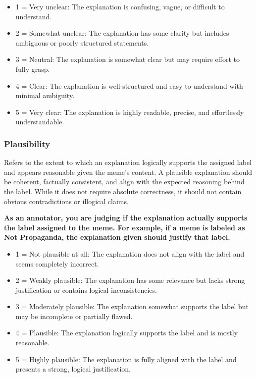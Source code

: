 \begin{itemize}[noitemsep,topsep=0pt,labelsep=.5em] %
    \item 1 = Very unclear: The explanation is confusing, vague, or difficult to understand.
    \item 2 = Somewhat unclear: The explanation has some clarity but includes ambiguous or poorly structured statements.
    \item 3 = Neutral: The explanation is somewhat clear but may require effort to fully grasp.
    \item 4 = Clear: The explanation is well-structured and easy to understand with minimal ambiguity.
    \item 5 = Very clear: The explanation is highly readable, precise, and effortlessly understandable.
\end{itemize}

\subsubsection{Plausibility}
Refers to the extent to which an explanation logically supports the assigned label and appears reasonable given the meme's content. A plausible explanation should be coherent, factually consistent, and align with the expected reasoning behind the label. While it does not require absolute correctness, it should not contain obvious contradictions or illogical claims.

\noindent
\textbf{As an annotator, you are judging if the explanation actually supports the label assigned to the meme. For example, if a meme is labeled as Not Propaganda, the explanation given should justify that label.}

\begin{itemize}[noitemsep,topsep=0pt,labelsep=.5em] %
    \item 1 = Not plausible at all: The explanation does not align with the label and seems completely incorrect.
    \item 2 = Weakly plausible: The explanation has some relevance but lacks strong justification or contains logical inconsistencies.
    \item 3 = Moderately plausible: The explanation somewhat supports the label but may be incomplete or partially flawed.
    \item 4 = Plausible: The explanation logically supports the label and is mostly reasonable.
    \item 5 = Highly plausible: The explanation is fully aligned with the label and presents a strong, logical justification.
\end{itemize}

